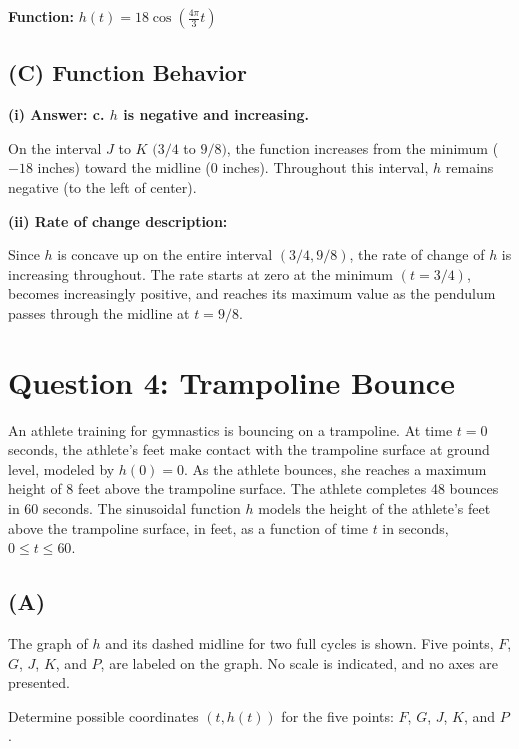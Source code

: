 \documentclass[11pt]{article}
\begin{document}
\textbf{Function:} $\displaystyle h(t) = 18 \cos\left(\frac{4\pi}{3} t\right)$

\subsection*{(C) Function Behavior}

\textbf{(i) Answer: c. $h$ is negative and increasing.}

On the interval $J$ to $K$ $(3/4$ to $9/8)$, the function increases from the minimum ($-18$ inches) toward the midline (0 inches). Throughout this interval, $h$ remains negative (to the left of center).

\vspace{0.5cm}
\textbf{(ii) Rate of change description:}

Since $h$ is concave up on the entire interval $(3/4, 9/8)$, the rate of change of $h$ is increasing throughout. The rate starts at zero at the minimum $(t = 3/4)$, becomes increasingly positive, and reaches its maximum value as the pendulum passes through the midline at $t = 9/8$.

\newpage

\section*{Question 4: Trampoline Bounce}

An athlete training for gymnastics is bouncing on a trampoline. At time $t = 0$ seconds, the athlete's feet make contact with the trampoline surface at ground level, modeled by $h(0) = 0$. As the athlete bounces, she reaches a maximum height of 8 feet above the trampoline surface. The athlete completes 48 bounces in 60 seconds. The sinusoidal function $h$ models the height of the athlete's feet above the trampoline surface, in feet, as a function of time $t$ in seconds, $0 \leq t \leq 60$.

\subsection*{(A)}
The graph of $h$ and its dashed midline for two full cycles is shown. Five points, $F$, $G$, $J$, $K$, and $P$, are labeled on the graph. No scale is indicated, and no axes are presented.

Determine possible coordinates $(t, h(t))$ for the five points: $F$, $G$, $J$, $K$, and $P$.
\end{document}
